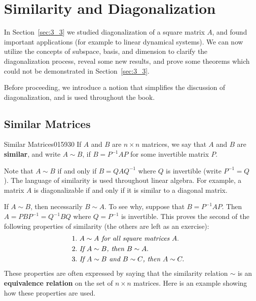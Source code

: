 \section{Similarity and Diagonalization}
\label{sec:5_5}

In Section~\ref{sec:3_3} we studied diagonalization of a square matrix $A$, and found important applications (for example to linear dynamical systems). We can now utilize the concepts of subspace, basis, and dimension to clarify the diagonalization process, reveal some new results, and prove some theorems which could not be demonstrated in Section~\ref{sec:3_3}.

Before proceeding, we introduce a notion that simplifies the discussion of diagonalization, and is used throughout the book.

\subsection*{Similar Matrices}

\begin{definition}{Similar Matrices}{015930} %
If $A$ and $B$ are $n \times n$ matrices, we say that $A$ and $B$ are \textbf{similar}, and write $A \sim B$, if $B = P^{-1}AP$ for some invertible matrix $P$.
\end{definition}

\noindent Note that $A \sim B$ if and only if $B = QAQ^{-1}$ where $Q$ is invertible (write $P^{-1} = Q$). The language of similarity is used throughout linear algebra. For example, a matrix $A$ is diagonalizable if and only if it is similar to a diagonal matrix.

If $A \sim B$, then necessarily $B \sim A$. To see why, suppose that $B = P^{-1}AP$. Then $A = PBP^{-1} = Q^{-1}BQ$ where $Q = P^{-1}$ is invertible. This proves the second of the following properties of similarity (the others are left as an exercise):
\begin{align}
\label{eq:equivalence_properties}
& 1.\ A \sim A \textit{\mbox{ for all square matrices }} A. \nonumber \\
& 2.\ \textit{\mbox{If }} A \sim B\textit{\mbox{, then }} B \sim A. \\
& 3.\ \textit{\mbox{If }} A \sim B \textit{\mbox{ and }} B \sim C \textit{\mbox{, then }} A \sim C. \nonumber
\end{align}
These properties are often expressed by saying that the similarity relation $\sim$ is an \textbf{equivalence relation} on the set of $n \times n$ matrices. Here is an example showing how these properties are used.


